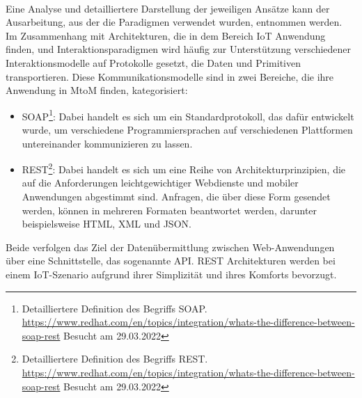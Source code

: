         \\
        \pagebreak
        \linebreak
        Eine Analyse und detailliertere Darstellung der jeweiligen Ansätze kann der Ausarbeitung, aus der die Paradigmen verwendet wurden, entnommen werden.
        \\
        \linebreak
        Im Zusammenhang mit Architekturen, die in dem Bereich \acs{IoT} Anwendung finden, und Interaktionsparadigmen wird häufig zur Unterstützung 
        verschiedener Interaktionsmodelle auf Protokolle gesetzt, die Daten und Primitiven transportieren. Diese Kommunikationsmodelle sind in zwei 
        Bereiche, die ihre Anwendung in \ac{MtoM} finden, kategorisiert:
        \\
        \begin{itemize}
            \item \ac{SOAP}\footnote{Detailliertere Definition des Begriffs SOAP. \url{https://www.redhat.com/en/topics/integration/whats-the-difference-between-soap-rest} Besucht am 29.03.2022}: 
            Dabei handelt es sich um ein Standardprotokoll, das dafür entwickelt wurde, 
            um verschiedene Programmiersprachen auf verschiedenen Plattformen untereinander 
            kommunizieren zu lassen.
            \item \ac{REST}\footnote{Detailliertere Definition des Begriffs REST. \url{https://www.redhat.com/en/topics/integration/whats-the-difference-between-soap-rest} Besucht am 29.03.2022}: 
            Dabei handelt es sich um eine Reihe von Architekturprinzipien, die auf 
            die Anforderungen leichtgewichtiger Webdienste und mobiler Anwendungen abgestimmt sind. 
            Anfragen, die über diese Form gesendet werden, können in mehreren Formaten beantwortet 
            werden, darunter beispielsweise \ac{HTML}, \ac{XML} und \ac{JSON}.
        \end{itemize}
        Beide verfolgen das Ziel der Datenübermittlung zwischen Web-Anwendungen über eine Schnittstelle, das sogenannte \ac{API}.
        \acs{REST} Architekturen werden bei einem \acs{IoT}-Szenario aufgrund ihrer Simplizität und ihres Komforts bevorzugt. \cite{IEEE2015} 

